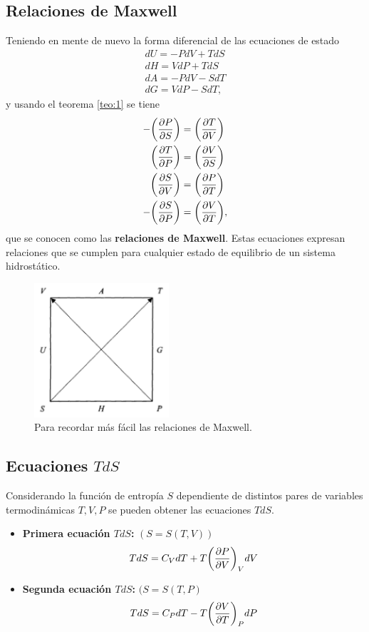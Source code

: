 \subsection{Relaciones de Maxwell}
Teniendo en mente de nuevo la forma diferencial de las
ecuaciones de estado
\begin{align*}
dU = -PdV+TdS\\
dH=VdP+TdS \\
dA=-PdV-SdT\\
dG=VdP-SdT,
\end{align*}
y usando el teorema \eqref{teo:1} se tiene
\begin{align}
-\qty(\pdv{P}{S})&=\qty(\pdv{T}{V}) \\
\qty(\pdv{T}{P})&=\qty(\pdv{V}{S}) \\
\qty(\pdv{S}{V})&=\qty(\pdv{P}{T}) \\
-\qty(\pdv{S}{P})&=\qty(\pdv{V}{T}),
\end{align}
que se conocen como las \h{\textbf{relaciones de Maxwell}}.
Estas ecuaciones expresan relaciones que se cumplen 
para cualquier estado de equilibrio de un sistema hidrostático.
\begin{figure}[H]
  \centering
  \includegraphics[width=5cm]{images/vat-vus.png}
  \caption{Para recordar más fácil las relaciones de Maxwell.}
  \label{fig:vat-vus}
\end{figure}

\subsection{Ecuaciones $TdS$}
Considerando la función de entropía $S$ dependiente de 
distintos pares de variables termodinámicas $T,V,P$ se pueden 
obtener las ecuaciones $TdS$. 
\begin{itemize}
\item \textbf{Primera ecuación $TdS$:} $(S=S(T,V))$
\begin{align}
TdS=C_VdT+T\qty(\pdv{P}{V})_VdV
\end{align}
\item \textbf{Segunda ecuación $TdS$:} $(S=S(T,P)$
\begin{align}
TdS=C_PdT-T\qty(\pdv{V}{T})_PdP
\end{align}
\end{itemize}


